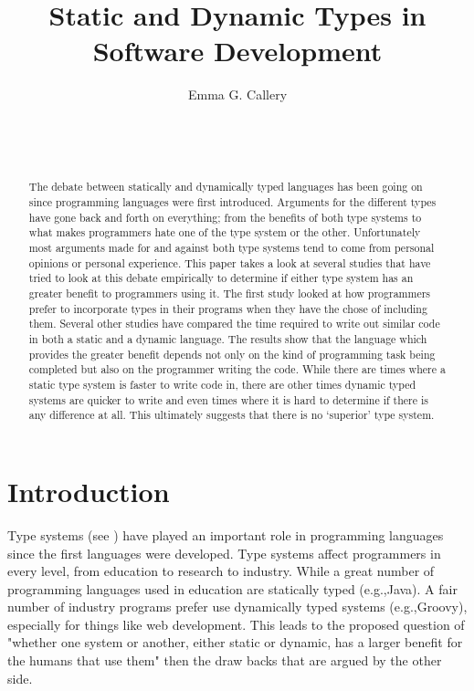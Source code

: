\documentclass{sig-alternate}
\begin{document}
\title{Static and Dynamic Types in Software Development}
\author{
\alignauthor
Emma G. Callery\\
	\\
	\\
	\\
}

\maketitle

\begin{abstract}
The debate between statically and dynamically typed languages has been going on since programming languages were first introduced. Arguments for the different types have gone back and forth on everything; from the benefits of both type systems to what makes programmers hate one of the type system or the other. Unfortunately most arguments made for and against both type systems tend to come from personal opinions or personal experience. 
This paper takes a look at several studies that have tried to look at this debate empirically to determine if either type system has an greater benefit to programmers using it. The first study looked at how programmers prefer to incorporate types in their programs when they have the chose of including them. Several other studies have compared the time required to write out similar code in both a static and a dynamic language. 
The results show that the language which provides the greater benefit depends not only on the kind of programming task being completed but also on the programmer writing the code. While there are times where a static type system is faster to write code in, there are other times dynamic typed systems are quicker to write and even times where it is hard to determine if there is any difference at all. This ultimately suggests that there is no `superior' type system. 
\end{abstract}


\section{Introduction}\label{intro}
Type systems (see \citep{Pierce2002}) have played an important role in programming languages since the first languages were developed. Type systems affect programmers in every level, from education to research to industry. While a great number of programming languages used in education are statically typed (e.g.,Java). A fair number of industry programs prefer use dynamically typed systems (e.g.,Groovy), especially for things like web development. This leads to the proposed question of "whether one system or another, either static or dynamic, has a larger benefit for the humans that use them"\cite{Mayer2012} then the draw backs that are argued by the other side. 
\end{document}
